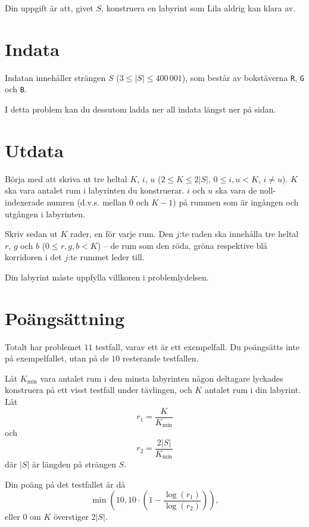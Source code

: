 Din uppgift är att, givet $S$, konstruera en labyrint som Lila aldrig kan klara av.

\section*{Indata}
Indatan innehåller strängen $S$ ($3 \leq |S| \leq 400\,001$), som består av bokstäverna \texttt{R}, \texttt{G} och \texttt{B}.

I detta problem kan du dessutom ladda ner all indata längst ner på sidan.

\section*{Utdata}
Börja med att skriva ut tre heltal $K$, $i$, $u$ ($2 \leq K \leq 2|S|$, $0 \leq i,u < K$, $i \neq u$).
$K$ ska vara antalet rum i labyrinten du konstruerar.
$i$ och $u$ ska vara de noll-indexerade numren (d.v.s. mellan $0$ och $K - 1$) på rummen som är ingången och utgången i labyrinten.

Skriv sedan ut $K$ rader, en för varje rum.
Den $j$:te raden ska innehålla tre heltal $r$, $g$ och $b$ ($0 \leq r,g,b < K$) -- de rum som den röda, gröna respektive blå korridoren i det $j$:te rummet leder till.

Din labyrint måste uppfylla villkoren i problemlydelsen.

\section*{Poängsättning}
Totalt har problemet $11$ testfall, varav ett är ett exempelfall.
Du poängsätts inte på exempelfallet, utan på de $10$ resterande testfallen.

Låt $K_{\min}$ vara antalet rum i den minsta labyrinten någon deltagare lyckades konstruera på ett visst testfall under tävlingen, och $K$ antalet rum i din labyrint.
Låt
$$r_1 = \frac{K}{K_{\min}}$$
och
$$r_2 = \frac{2|S|}{K_{\min}}$$
där $|S|$ är längden på strängen $S$.

Din poäng på det testfallet är då
$$\min\left(10, 10 \cdot \left(1 - \frac{\log(r_1)}{\log(r_2)}\right)\right),$$
eller $0$ om $K$ överstiger $2|S|$.
